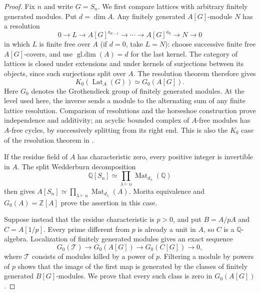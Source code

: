 \begin{proof}
Fix $n$ and write $G=S_n$.  We first compare lattices with arbitrary
finitely generated modules.  Put $d=\dim A$.  Any finitely generated
$A[G]$-module $N$ has a resolution
\[
 0\longrightarrow L\longrightarrow A[G]^{a_{d-1}}
 \longrightarrow\cdots\longrightarrow A[G]^{a_0}
 \longrightarrow N\longrightarrow 0
\]
in which $L$ is finite free over $A$ (if $d=0$, take $L=N$): choose successive finite free
$A[G]$-covers, and use $\operatorname{gl.dim}(A)=d$ for the last kernel.
The category of lattices is closed under extensions and under kernels
of surjections between its objects, since such surjections split over
$A$.  The resolution theorem therefore gives
\begin{equation}\label{eq:lattice-G0}
 K_0(\operatorname{Lat}_A(G))\simeq G_0(A[G]).
\end{equation}
Here $G_0$ denotes the Grothendieck group of finitely generated modules.
At the level used here, the inverse sends a module to the alternating
sum of any finite lattice resolution.  Comparison of resolutions and
the horseshoe construction prove independence and additivity; an
acyclic bounded complex of $A$-free modules has $A$-free cycles, by
successively splitting from its right end.  This is also the
$K_0$ case of the resolution theorem in
\cite[\S4, Theorem~3 and Corollary~1]{Quillen1973}.

If the residue field of $A$ has characteristic zero, every positive
integer is invertible in $A$.  The split Wedderburn decomposition
\[
 \mathbb Q[S_n]\simeq
 \prod_{\lambda\vdash n}\operatorname{Mat}_{d_\lambda}(\mathbb Q)
\]
then gives $A[S_n]\simeq\prod_{\lambda\vdash n}
\operatorname{Mat}_{d_\lambda}(A)$.  Morita equivalence and
$G_0(A)=\mathbb Z[A]$ prove the assertion in this case.

Suppose instead that the residue characteristic is $p>0$, and put
$B=A/pA$ and $C=A[1/p]$.  Every prime different from $p$ is already a
unit in $A$, so $C$ is a $\mathbb Q$-algebra.  Localization of
finitely generated modules gives an exact sequence
\begin{equation}\label{eq:regular-localization}
 G_0(\mathcal T)\longrightarrow G_0(A[G])
 \longrightarrow G_0(C[G])\longrightarrow 0,
\end{equation}
where $\mathcal T$ consists of modules killed by a power of $p$.
Filtering a module by powers of $p$ shows that the image of the first
map is generated by the classes of finitely generated $B[G]$-modules.
We prove that every such class is zero in $G_0(A[G])$.


\end{proof}
